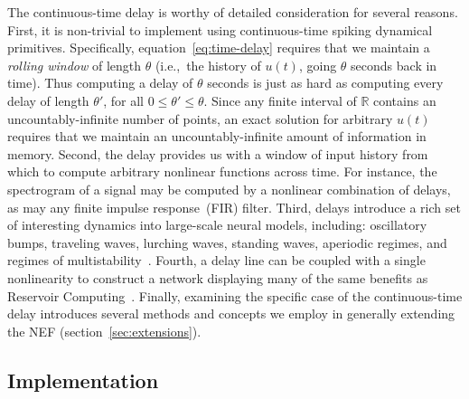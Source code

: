 \documentclass[12pt]{article}
\theoremstyle{definition}
\begin{document}
The continuous-time delay is worthy of detailed consideration for several reasons.
First, it is non-trivial to implement using continuous-time spiking dynamical primitives.
Specifically, equation~\ref{eq:time-delay} requires that we maintain a \emph{rolling window} of length $\theta$ (i.e.,~the history of $u(t)$, going $\theta$ seconds back in time).
Thus computing a delay of $\theta$ seconds is just as hard as computing every delay of length $\theta'$, for all $0 \le \theta' \le \theta$.
Since any finite interval of $\mathbb{R}$ contains an uncountably-infinite number of points, an exact solution for arbitrary $u(t)$ requires that we maintain an uncountably-infinite amount of information in memory.
Second, the delay provides us with a window of input history from which to compute arbitrary nonlinear functions across time.
For instance, the spectrogram of a signal may be computed by a nonlinear combination of delays, as may any finite impulse response~(FIR) filter.
Third, delays introduce a rich set of interesting dynamics into large-scale neural models, including: oscillatory bumps, traveling waves, lurching waves, standing waves, aperiodic regimes, and regimes of multistability~\citep{roxin2005role}.
Fourth, a delay line can be coupled with a single nonlinearity to construct a network displaying many of the same benefits as Reservoir Computing~\citep{appeltant2011information}.
Finally, examining the specific case of the continuous-time delay introduces several methods and concepts we employ in generally extending the NEF (section~\ref{sec:extensions}).

\subsection{Implementation}
\label{sec:delay-implementation}
\end{document}
